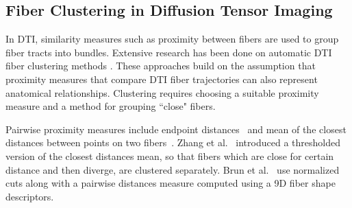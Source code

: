 \subsection {Fiber Clustering in Diffusion Tensor Imaging}
\label {subsec:fiberClus}
In DTI, similarity measures such as proximity between fibers are used to group fiber tracts into bundles. Extensive research has been done on automatic DTI fiber clustering methods \cite{Brun2004,Brun2003,Corouge2004,westinMEDIA02,Zhang2008}. These approaches build on the assumption that proximity measures that compare DTI fiber trajectories can also represent anatomical relationships.
Clustering requires choosing a suitable proximity measure and a method for grouping ``close" fibers.

Pairwise proximity measures include endpoint distances~\cite{Brun2003} and mean of the closest distances between points on two fibers~\cite{Corouge2004}. Zhang et al.~\cite{Zhang2008} introduced a thresholded version of the closest distances mean, so that fibers which are close for certain distance and then diverge, are clustered separately. Brun et al.~\cite{Brun2004} use normalized cuts along with a pairwise distances measure computed using a 9D fiber shape descriptors. 

